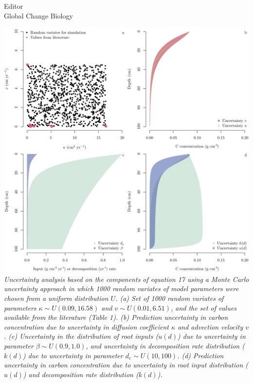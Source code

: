 \documentclass[11pt]{bgcletter}
\begin{document}
\begin{letter}{Editor\\
   Global Change Biology
}
\begin{center}
   \includegraphics[width=\textwidth]{../Figures/uncertainty.pdf} \\
  \textit{\tiny Uncertainty analysis based on the components of equation 17 using a Monte Carlo uncertainty approach in which 1000 random variates of model parameters were chosen from a uniform distribution $U$. (a) Set of 1000 random variates of parameters $\kappa \sim U(0.09, 16.58)$ and $v \sim U(0.01, 6.51)$, and the set of values available from the literature (Table 1). (b) Prediction uncertainty in carbon concentration due to uncertainty in diffusion coefficient $\kappa$ and advection velocity $v$. (c) Uncertainty in the distribution of root inputs ($u(d)$) due to uncertainty in parameter $\beta \sim U(0.9, 1.0)$, and uncertainty in decomposition rate distribution ($k(d)$) due to uncertainty in parameter $d_e \sim U(10, 100)$. (d) Prediction uncertainty in carbon concentration due to uncertainty in root input distribution ($u(d)$) and decomposition rate distribution ($k(d)$). }
\end{center}



\end{letter}
\end{document}
